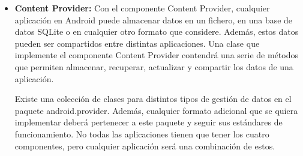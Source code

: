 \documentclass[letterpaper,12pt,openany,oneside]{book}
\begin{document}
\begin{itemize}
\item \textbf{Content Provider:} Con el componente Content Provider, cualquier aplicación en Android puede almacenar datos en un fichero, en una base de datos SQLite o en cualquier otro formato que considere. Además, estos datos pueden ser compartidos entre distintas aplicaciones. Una clase que implemente el componente Content Provider contendrá una serie de métodos que permiten almacenar, recuperar, actualizar y compartir los datos de una aplicación.

      Existe una colección de clases para distintos tipos de gestión de datos en el paquete android.provider. Además, cualquier formato adicional que se quiera implementar deberá pertenecer a este paquete y seguir sus estándares de funcionamiento.
    No todas las aplicaciones tienen que tener los cuatro componentes, pero cualquier aplicación será una combinación de estos.
\end{itemize}
\end{document}
